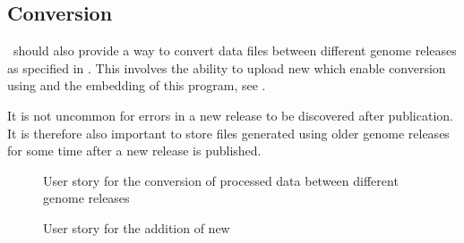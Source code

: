 

\subsection{Conversion}
\appName\ should also provide a way to convert  data files between different genome releases as specified in . This involves the ability to upload new  which enable conversion using  and the embedding of this program, see .

It is not uncommon for errors in a new release to be discovered after publication. It is therefore also important to store files generated using older genome releases for some time after a new release is published.

\begin{figure}[h]
\caption{User story for the conversion of processed data between different genome releases}
\label{fig:target_genome}
\end{figure}

\begin{figure}[h]
\caption{User story for the addition of new }
\label{fig:target_chain}
\end{figure}
\FloatBarrier

